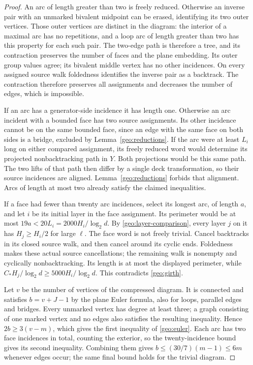 \begin{proof}
An arc of length greater than two is freely reduced.  Otherwise an inverse
pair with an unmarked bivalent midpoint can be erased, identifying its two
outer vertices.  Those outer vertices are distinct in the diagram: the
interior of a maximal arc has no repetitions, and a loop arc of length
greater than two has this property for each such pair.  The two-edge path
is therefore a tree, and its contraction preserves the number of faces
and the plane embedding.  Its outer group values agree; its bivalent
middle vertex has no other incidences.  On every assigned source walk
foldedness identifies the inverse pair as a backtrack.  The contraction
therefore preserves all assignments and decreases the number of edges,
which is impossible.

If an arc has a generator-side incidence it has length one.  Otherwise an
arc incident with a bounded face has two source assignments.  Its other
incidence cannot be on the same bounded face, since an edge with the same
face on both sides is a bridge, excluded by Lemma~\ref{geo:reductions}.
If the arc were at least $L_i$ long on either compared assignment, its
freely reduced word would determine its projected nonbacktracking path in
$Y$.  Both projections would be this same path.  The two lifts of that
path then differ by a single deck transformation, so their source
incidences are aligned.  Lemma~\ref{geo:reductions} forbids that alignment.
Arcs of length at most two already satisfy the claimed inequalities.

If a face had fewer than twenty arc incidences, select its longest arc,
of length $a$, and let $i$ be its initial layer in the face assignment.
Its perimeter would be at most $19a<20L_i=2000H_i/\log_2d$.
By \eqref{geo:layer-comparison}, every layer $j$ on it has
$H_j\ge H_i/2$ for large $\ell$.  The face word is not freely trivial.
Cancel backtracks in its closed source walk, and then cancel around its
cyclic ends.  Foldedness makes these actual source cancellations; the
remaining walk is nonempty and cyclically nonbacktracking.  Its length
is at most the displayed perimeter, while
$C_*H_j/\log_2d\ge5000H_i/\log_2d$.  This contradicts
\eqref{geo:girth}.

Let $v$ be the number of vertices of the compressed diagram.  It is
connected and satisfies $b=v+J-1$ by the plane Euler formula, also for
loops, parallel edges and bridges.  Every unmarked vertex has degree at
least three; a graph consisting of one marked vertex and no edges also
satisfies the resulting inequality.  Hence
$2b\ge3(v-m)$, which gives the first inequality of
\eqref{geo:euler}.  Each arc has two face incidences in total, counting
the exterior, so the twenty-incidence bound gives its second inequality.
Combining them gives $b\le(30/7)(m-1)\le6m$ whenever edges occur;
the same final bound holds for the trivial diagram.
\end{proof}

